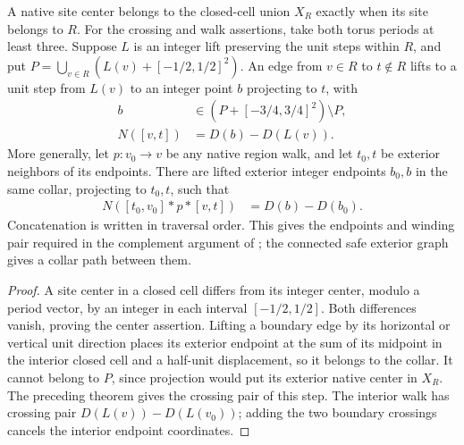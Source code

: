 \begin{lemma}%
    \label{thm:peps_torus_region_boundary_lift}
    \leanok
    A native site center belongs to the closed-cell union $X_R$ exactly
    when its site belongs to $R$. For the crossing and walk assertions,
    take both torus periods at least three. Suppose $L$ is an integer lift
    preserving the unit steps within $R$, and put
    $P=\bigcup_{v\in R}(L(v)+[-1/2,1/2]^2)$.
    An edge from $v\in R$ to $t\notin R$ lifts to a unit step from
    $L(v)$ to an integer point $b$ projecting to $t$, with
    \begin{align}
        b        & \in (P+[-3/4,3/4]^2)\setminus P, \\
        N([v,t]) & =D(b)-D(L(v)).
    \end{align}
    More generally, let $p:v_0\to v$ be any native region walk, and
    let $t_0,t$ be exterior neighbors of its endpoints. There are lifted
    exterior integer endpoints $b_0,b$ in the same collar, projecting
    to $t_0,t$, such that
    \begin{align}
        N([t_0,v_0]*p*[v,t]) & =D(b)-D(b_0).
    \end{align}
    Concatenation is written in traversal order. This gives the
    endpoints and winding pair required in the complement argument of
    \cite[proof of Theorem~6.9]{Schuch2010PEPS}; the connected safe exterior graph gives a collar path between them.
\end{lemma}
\begin{proof}\leanok
    A site center in a closed cell differs from its integer center,
    modulo a period vector, by an integer in each interval $[-1/2,1/2]$.
    Both differences vanish, proving the center assertion. Lifting a boundary
    edge by its horizontal or vertical unit direction places its exterior
    endpoint at the sum of its midpoint in the interior closed cell and
    a half-unit displacement, so it belongs to the collar. It cannot
    belong to $P$, since projection would put its exterior native center
    in $X_R$. The preceding theorem gives the crossing pair of this step.
    The interior walk has crossing pair $D(L(v))-D(L(v_0))$; adding the
    two boundary crossings cancels the interior endpoint coordinates.
\end{proof}

